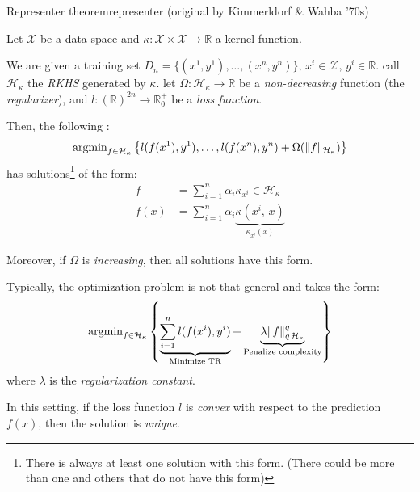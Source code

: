 
\begin{theorem}{Representer theorem}{representer}
	(original by Kimmerldorf \& Wahba '70s)

	Let $\mathcal X$ be a data space and
	$\kappa : \mathcal X \times \mathcal X \to \mathds R$ a kernel function.

	We are given a training set $D_n =\{(x^1, y^1), \dots, (x^n, y^n)\},\,
		x^i \in \mathcal X,\, y^i \in \mathds R$.
	call $\mathcal H_\kappa$ the \emph{RKHS} generated by $\kappa$.
	let $\Omega: \mathcal H_\kappa \to \mathds R$ be a \emph{non-decreasing}
	function (the \emph{regularizer}), and
	$l: (\mathds R)^{2n} \to \mathds R^+_0$ be a \emph{loss function}.

	Then, the following :
	\begin{align*}
		\operatorname{argmin}_{f \in \mathcal H_\kappa}
		\left\{
		l(f(x^1), y^1) , \ldots , l(f(x^n), y^n) + \Omega(\lVert f \rVert_{\mathcal H_\kappa})
		\right\}
	\end{align*}
	has solutions\footnote{There is always at least one solution with this form. (There could be more than one and others that do not have this form)} of the form:
	\begin{align*}
		f    & = \sum_{i=1}^n \alpha_i \kappa_{x^i} \in \mathcal H_\kappa \\
		f(x) & = \sum_{i=1}^n \alpha_i
		\underbrace{\kappa(x^i,\, x)}_{\kappa_{x^i}(x)}
	\end{align*}

	Moreover, if $\Omega$ is \emph{increasing}, then all solutions have
	this form.

	\begin{note}
		Typically, the optimization problem is not that general and takes
		the form:
		\begin{equation*}
			\operatorname{argmin}_{f \in \mathcal H_\kappa} \left\{
			\underbrace{\sum_{i=1}^n l(f(x^i), y^i)}_{\text{Minimize TR}} +
			\underbrace{\lambda \lVert f \rVert_{q\,\mathcal H_\kappa}^q}_{\text{Penalize complexity}}
			\right\}
		\end{equation*}
		where $\lambda$ is the \emph{regularization constant}.

		\tcbline

		In this setting, if the loss function $l$ is \emph{convex}
		with respect to the prediction $f(x)$, then the solution is
		\emph{unique}.
	\end{note}

\end{theorem}

